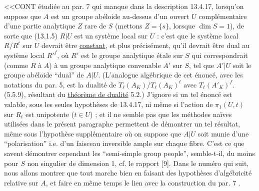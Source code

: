 
<<CONT étudiée au par. 7 qui manque dans la description 13.4.17, lorsqu'on suppose que $A$ est un groupe abéloide au-dessus d'un ouvert $U$ complémentaire d'une partie analytique $Z$ rare de $S$ (mettons $Z = \{s\}$, lorsque $\dim S = 1$), de sorte que (13.1.5) $R|U$ est un système local sur $U$ : c'est que le système local $R/R^t$ sur $U$ devrait être \underline{constant}, et plus précisément, qu'il devrait être dual au système local ${R'}^{f}$, où $R'$ est le groupe analytique étale sur $S$ qui correspondrait (comme $R$ à $A$) à un groupe analytique convenable $A'$ sur $S$, tel que $A'|U$ soit le groupe abéloide ``dual'' de $A|U$. (L'analogue algébrique de cet énoncé, avec les notations du par. 5, est la dualité de $T_{\ell}(A_K)/T_{\ell}(A_K)^t$ avec $T_{\ell}(A'_K)^f$. (5.5.9), résultant du \underline{théorème de dualité} 5.2.) J'ignore si un tel énoncé est valable, sous les seules hypothèses de 13.4.17, ni même si l'action de $\pi_1(U,t)$ sur $R_t$ est unipotente ($t \in U$) ; et il ne semble pas que les méthodes naïves utilisées dans le présent paragraphe permettent de démontrer un tel résultat, même sous l'hypothèse supplémentaire où on suppose que $A|U$ soit munie d'une ``polarisation'' i.e. d'un faisceau inversible ample sur chaque fibre. C'est ce que savent démontrer cependant les ``semi-simple group people'', semble-t-il, du moins pour $S$ non singulier de dimension 1, cf. le rapport [9]. Dans le numéro qui suit, nous allons montrer que tout marche bien en faisant des hypothèses d'algébricité relative sur $A$, et faire en même temps le lien avec la construction du par. 7 .



